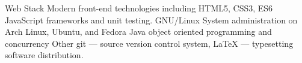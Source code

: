 

\begin{cvskills}


  \cvskill
    {Web Stack} %
    {Modern front-end technologies including HTML5, CSS3, ES6 JavaScript frameworks and unit testing.}
  \cvskill
    {GNU/Linux} %
    {System administration on Arch Linux, Ubuntu, and Fedora} %
  \cvskill
    {Java} %
    {object oriented programming and concurrency}
  \cvskill
    {Other} %
    {git --- source version control system, LaTeX --- typesetting software distribution.}

\end{cvskills}

